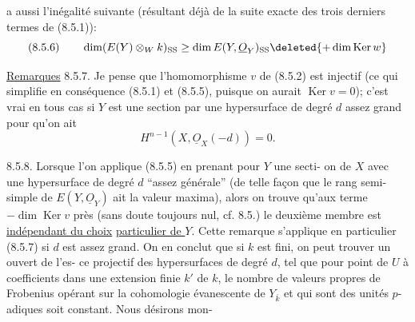 a aussi l'inégalité suivante (résultant déjà de la suite exacte des
trois derniers termes de (8.5.1)):
\[
(8.5.6)\qquad \dim(E(Y)\otimes_W k)_{\mathrm{SS}}\geq\dim E(Y,\underline O_Y)_{\mathrm{SS}}\deleted{+\dim\operatorname{Ker}w}
\]

\uline{Remarques} 8.5.7. Je pense que l'homomorphisme $v$ de (8.5.2) est
injectif\deleted{\unsure{,}} (ce qui simplifie en conséquence (8.5.1) et (8.5.5), puisque
on aurait $\operatorname{Ker}v=0$); c'est vrai en tous cas si 
$Y$ est 
une section par une hypersurface de degré $d$ assez grand pour qu'on ait
\[H^{n-1}(X,\underline O_X(-d))=0.\]


8.5.8. Lorsque  l'on applique (8.5.5) en prenant pour $Y$ une secti-
on de $X$ avec une hypersurface de degré $d$ ``assez générale'' (de telle
façon que le rang semi-simple de $E(Y,\underline O_Y)$ ait la valeur maxima), alors
on trouve qu'aux terme $-\dim\operatorname{Ker}v$ près (sans doute toujours nul, cf.
8.5.) le deuxième membre est \uline{indépendant du choix}  \uline{particulier de $Y$}.
Cette remarque s'applique en particulier (8.5.7) si $d$ est assez grand.
On en conclut que si $k$ est fini,  on peut trouver un ouvert  de l'es-
ce projectif des hypersurfaces de degré $d$, tel que pour  point  de $U$
à coefficients dans une extension finie $k'$ de $k$, le nombre de valeurs
propres de Frobenius opérant sur la cohomologie évanescente de $Y_{\bar k}$ et
qui sont des unités $p$-adiques soit constant.  Nous désirons mon-
